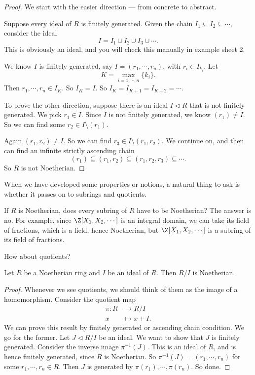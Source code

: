 \documentclass[a4paper]{article}
\begin{document}
\begin{proof}
  We start with the easier direction --- from concrete to abstract.

  Suppose every ideal of $R$ is finitely generated. Given the chain $I_1 \subseteq I_2 \subseteq \cdots$, consider the ideal
  \[
    I = I_1 \cup I_2 \cup I_3 \cup \cdots.
  \]
  This is obviously an ideal, and you will check this manually in example sheet 2.

  We know $I$ is finitely generated, say $I = (r_1, \cdots, r_n)$, with $r_i \in I_{k_i}$. Let
  \[
    K = \max_{i = 1, \cdots, n}\{k_i\}.
  \]
  Then $r_1, \cdots, r_n \in I_K$. So $I_K = I$. So $I_K = I_{K + 1} = I_{K + 2} = \cdots$.

  To prove the other direction, suppose there is an ideal $I \lhd R$ that is not finitely generated. We pick $r_1 \in I$. Since $I$ is not finitely generated, we know $(r_1) \not= I$. So we can find some $r_2 \in I \setminus (r_1)$.

  Again $(r_1, r_2) \not= I$. So we can find $r_3 \in I\setminus (r_1, r_2)$. We continue on, and then can find an infinite strictly ascending chain
  \[
    (r_1) \subseteq (r_1, r_2) \subseteq (r_1, r_2, r_3) \subseteq \cdots.
  \]
  So $R$ is not Noetherian.
\end{proof}
When we have developed some properties or notions, a natural thing to ask is whether it passes on to subrings and quotients.

If $R$ is Noetherian, does every subring of $R$ have to be Noetherian? The answer is no. For example, since $\Z[X_1, X_2, \cdots]$ is an integral domain, we can take its field of fractions, which is a field, hence Noetherian, but $\Z[X_1, X_2, \cdots]$ is a subring of its field of fractions.

How about quotients?
\begin{prop}
  Let $R$ be a Noetherian ring and $I$ be an ideal of $R$. Then $R/I$ is Noetherian.
\end{prop}

\begin{proof}
  Whenever we see quotients, we should think of them as the image of a homomorphism. Consider the quotient map
  \begin{align*}
    \pi: R&\to R/I\\
    x &\mapsto x + I.
  \end{align*}
  We can prove this result by finitely generated or ascending chain condition. We go for the former. Let $J \lhd R/I$ be an ideal. We want to show that $J$ is finitely generated. Consider the inverse image $\pi^{-1}(J)$. This is an ideal of $R$, and is hence finitely generated, since $R$ is Noetherian. So $\pi^{-1}(J) = (r_1, \cdots, r_n)$ for some $r_1, \cdots, r_n \in R$. Then $J$ is generated by $\pi(r_1), \cdots, \pi(r_n)$. So done.
\end{proof}
\end{document}
